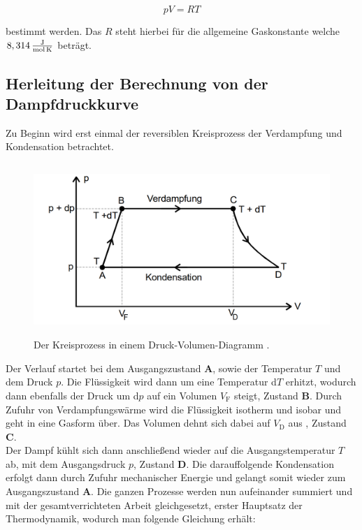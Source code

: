 \begin{equation}
    pV = RT \label{1}
\end{equation}

\begin{flushleft}
    bestimmt werden. Das $R$ steht hierbei für die allgemeine Gaskonstante welche $8,314\, \frac{\text{J}}{\text{mol\,K}}$ beträgt.
\end{flushleft}

\subsection{Herleitung der Berechnung von der Dampfdruckkurve}

\begin{flushleft}
    Zu Beginn wird erst einmal der reversiblen Kreisprozess der Verdampfung und Kondensation betrachtet.
\end{flushleft}

\begin{figure}[H]       
    \centering
    \includegraphics[height=65mm]{bilder/Kreisprozess.png}
    \caption{Der Kreisprozess in einem Druck-Volumen-Diagramm \cite{a1}. \label{Abbildung2} }
\end{figure}

\begin{flushleft}
    Der Verlauf startet bei dem Ausgangszustand \textbf{A}, sowie der Temperatur $T$ und dem Druck $p$.
    Die Flüssigkeit wird dann um eine Temperatur d$T$ erhitzt, wodurch dann ebenfalls der Druck um d$p$ auf ein Volumen $V_{\text{F}}$ steigt, Zustand \textbf{B}.
    Durch Zufuhr von Verdampfungswärme wird die Flüssigkeit isotherm und isobar und geht in eine Gasform über.
    Das Volumen dehnt sich dabei auf $V_{\text{D}}$ aus , Zustand \textbf{C}.\\
    \vspace{0.3cm}
    Der Dampf kühlt sich dann anschließend wieder auf die Ausgangstemperatur $T$ ab, mit dem Ausgangsdruck $p$, Zustand \textbf{D}.
    Die darauffolgende Kondensation erfolgt dann durch Zufuhr mechanischer Energie und gelangt somit wieder zum Ausgangszustand \textbf{A}.
    Die ganzen Prozesse werden nun aufeinander summiert und mit der gesamtverrichteten Arbeit gleichgesetzt, erster Hauptsatz der Thermodynamik, wodurch man folgende Gleichung erhält:
\end{flushleft}

